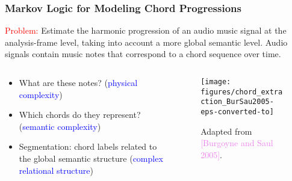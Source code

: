\documentclass[12pt]{beamer}
\begin{document}


\begin{frame}
\frametitle{Markov Logic for Modeling Chord Progressions}

\textcolor{red}{Problem:} Estimate the harmonic progression of an audio music signal 
at the analysis-frame level, taking into account a more global semantic level. Audio signals contain music notes that correspond to a chord sequence over time. 
\vspace{-0.5cm}
\begin{columns}[c] 
\begin{column}{0.55\textwidth} 
\begin{itemize}
\item What are these notes? (\textcolor{blue}{physical complexity})
\item  Which chords do they represent? (\textcolor{blue}{semantic complexity})
\item  Segmentation: chord labels related to the global semantic structure (\textcolor{blue}{complex relational structure})


\end{itemize}
\end{column} 

\begin{column}{0.45\textwidth} 
\begin{figure}[htb]
   \centering
   \texttt{[image: figures/chord\_extraction\_BurSau2005-eps-converted-to]}
   \caption{Adapted from \textcolor{violet}{[Burgoyne and Saul 2005]}.}
\end{figure}
\end{column}
\end{columns}
\medskip 



\end{frame}
\end{document}
